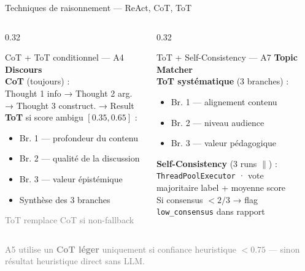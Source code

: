\documentclass[aspectratio=169, 12pt]{beamer}
\begin{document}
\begin{frame}{Techniques de raisonnement — ReAct, CoT, ToT}
\begin{columns}[T]
    \begin{column}{0.32\textwidth}
      \begin{block}{CoT + ToT conditionnel — A4}
        \small\textbf{Discours}\\[0.3em]
        \scriptsize
        \textbf{CoT} (toujours) :\\
        Thought 1 info → Thought 2 arg.\\
        → Thought 3 construct. → Result\\[0.4em]
        \textbf{ToT} si score ambigu $[0.35, 0.65]$ :\\
        \begin{itemize}\setlength{\itemsep}{1pt}
          \item Br. 1 — profondeur du contenu
          \item Br. 2 — qualité de la discussion
          \item Br. 3 — valeur épistémique
          \item Synthèse des 3 branches
        \end{itemize}
        \textcolor{gray}{\tiny ToT remplace CoT si non-fallback}
      \end{block}
    \end{column}

    \begin{column}{0.32\textwidth}
      \begin{block}{ToT + Self-Consistency — A7}
        \small\textbf{Topic Matcher}\\[0.3em]
        \scriptsize
        \textbf{ToT systématique} (3 branches) :\\
        \begin{itemize}\setlength{\itemsep}{1pt}
          \item Br. 1 — alignement contenu
          \item Br. 2 — niveau audience
          \item Br. 3 — valeur pédagogique
        \end{itemize}
        \vspace{0.2cm}
        \textbf{Self-Consistency} (3 runs $\parallel$) :\\
        \texttt{ThreadPoolExecutor} · vote\\
        majoritaire label + moyenne score\\
        Si consensus $< 2/3$ → flag\\
        \texttt{low\_consensus} dans rapport
      \end{block}
    \end{column}

  \end{columns}

  \vspace{0.2cm}
  \begin{center}
    \scriptsize
    \textcolor{gray}{A5 utilise un \textbf{CoT léger} uniquement si confiance heuristique $< 0.75$ —
    sinon résultat heuristique direct sans LLM.}
  \end{center}

\end{frame}
\end{document}
